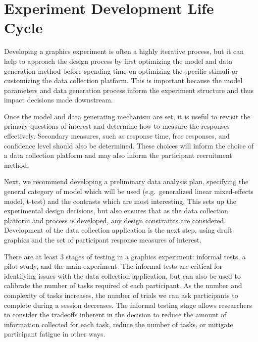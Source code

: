 \documentclass[
  10pt,
]{article}
\begin{document}
\section{Experiment Development Life
Cycle}\label{experiment-development-life-cycle}

Developing a graphics experiment is often a highly iterative process,
but it can help to approach the design process by first optimizing the
model and data generation method before spending time on optimizing the
specific stimuli or customizing the data collection platform. This is
important because the model parameters and data generation process
inform the experiment structure and thus impact decisions made
downstream.

Once the model and data generating mechanism are set, it is useful to
revisit the primary questions of interest and determine how to measure
the responses effectively. Secondary measures, such as response time,
free responses, and confidence level should also be determined. These
choices will inform the choice of a data collection platform and may
also inform the participant recruitment method.

Next, we recommend developing a preliminary data analysis plan,
specifying the general category of model which will be used
(e.g.~generalized linear mixed-effects model, t-test) and the contrasts
which are most interesting. This sets up the experimental design
decisions, but also ensures that as the data collection platform and
process is developed, any design constraints are considered. Development
of the data collection application is the next step, using draft
graphics and the set of participant response measures of interest.

There are at least 3 stages of testing in a graphics experiment:
informal tests, a pilot study, and the main experiment. The informal
tests are critical for identifying issues with the data collection
application, but can also be used to calibrate the number of tasks
required of each participant. As the number and complexity of tasks
increases, the number of trials we can ask participants to complete
during a session decreases. The informal testing stage allows
researchers to consider the tradeoffs inherent in the decision to reduce
the amount of information collected for each task, reduce the number of
tasks, or mitigate participant fatigue in other ways.
\end{document}
